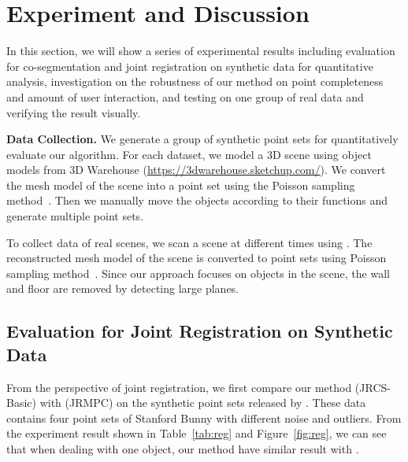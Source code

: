\section{Experiment and Discussion}
\label{sec:results}
In this section, we will show a series of experimental results including evaluation for co-segmentation and joint registration on synthetic data for quantitative analysis, investigation on the robustness of our method on point completeness and amount of user interaction, and testing on one group of real data and verifying the result visually.

\noindent \textbf{Data Collection.} 
We generate a group of synthetic point sets for quantitatively evaluate our algorithm. 
%
For each dataset, we model a 3D scene using object models from 3D Warehouse (\url{https://3dwarehouse.sketchup.com/}).
We convert the mesh model of the scene into a point set using the Poisson sampling method~\cite{PossionSampling}.
%
Then we manually move the objects according to their functions and generate multiple point sets. 

To collect data of real scenes, we scan a scene at different times using \cite{VXH}.
%
The reconstructed mesh model of the scene is converted to point sets using Poisson sampling method~\cite{PossionSampling}.
% 
Since our approach focuses on objects in the scene, the wall and floor are removed by detecting large planes.


\subsection{Evaluation for Joint Registration on Synthetic Data}
From the perspective of joint registration, we first compare our method (JRCS-Basic) with \cite{Evangelidis2014}(JRMPC) on the synthetic point sets released by \cite{Evangelidis2014}. These data contains four point sets of Stanford Bunny with different noise and outliers. From the experiment result shown in Table~\ref{tab:reg} and Figure~\ref{fig:reg}, we can see that when dealing with one object, our method have similar result with \cite{Evangelidis2014}.

